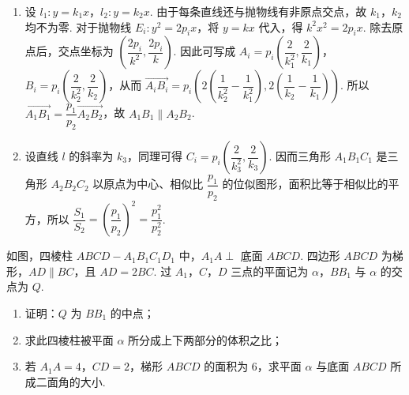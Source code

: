 \begin{solution}
\begin{enumerate}
\item 设 \(l_{1}:y=k_{1}x\)，\(l_{2}:y=k_{2}x\). 由于每条直线还与抛物线有非原点交点，故 \(k_{1}\)，\(k_{2}\) 均不为零. 对于抛物线 \(E_i:y^{2}=2p_i x\)，将 \(y=kx\) 代入，得 \(k^{2}x^{2}=2p_i x\). 除去原点后，交点坐标为 \(\left(\dfrac{2p_i}{k^{2}},\dfrac{2p_i}{k}\right)\). 因此可写成 \(A_i=p_i\left(\dfrac{2}{k_{1}^{2}},\dfrac{2}{k_{1}}\right)\)，\(B_i=p_i\left(\dfrac{2}{k_{2}^{2}},\dfrac{2}{k_{2}}\right)\)，从而 \(\overrightarrow{A_iB_i}=p_i\left(2\left(\dfrac{1}{k_{2}^{2}}-\dfrac{1}{k_{1}^{2}}\right),2\left(\dfrac{1}{k_{2}}-\dfrac{1}{k_{1}}\right)\right)\). 所以 \(\overrightarrow{A_{1}B_{1}}=\dfrac{p_{1}}{p_{2}}\overrightarrow{A_{2}B_{2}}\)，故 \(A_{1}B_{1}\parallel A_{2}B_{2}\).
\item 设直线 \(l\) 的斜率为 \(k_{3}\)，同理可得 \(C_i=p_i\left(\dfrac{2}{k_{3}^{2}},\dfrac{2}{k_{3}}\right)\). 因而三角形 \(A_{1}B_{1}C_{1}\) 是三角形 \(A_{2}B_{2}C_{2}\) 以原点为中心、相似比 \(\dfrac{p_{1}}{p_{2}}\) 的位似图形，面积比等于相似比的平方，所以 \(\dfrac{S_{1}}{S_{2}}=\left(\dfrac{p_{1}}{p_{2}}\right)^{2}=\dfrac{p_{1}^{2}}{p_{2}^{2}}\).
\end{enumerate}
\end{solution}

\begin{problem}
如图，四棱柱 \(ABCD - A_{1}B_{1}C_{1}D_{1}\) 中，\(A_{1}A \perp\) 底面 \(ABCD\). 四边形 \(ABCD\) 为梯形，\(AD \parallel BC\)，且 \(AD = 2BC\). 过 \(A_{1}\)，\(C\)，\(D\) 三点的平面记为 \(\alpha\)，\(BB_{1}\) 与 \(\alpha\) 的交点为 \(Q\).

\begin{enumerate}
\item 证明：\(Q\) 为 \(BB_{1}\) 的中点；
\item 求此四棱柱被平面 \(\alpha\) 所分成上下两部分的体积之比；
\item 若 \(A_{1}A = 4\)，\(CD = 2\)，梯形 \(ABCD\) 的面积为 6，求平面 \(\alpha\) 与底面 \(ABCD\) 所成二面角的大小.
\end{enumerate}

\end{problem}

